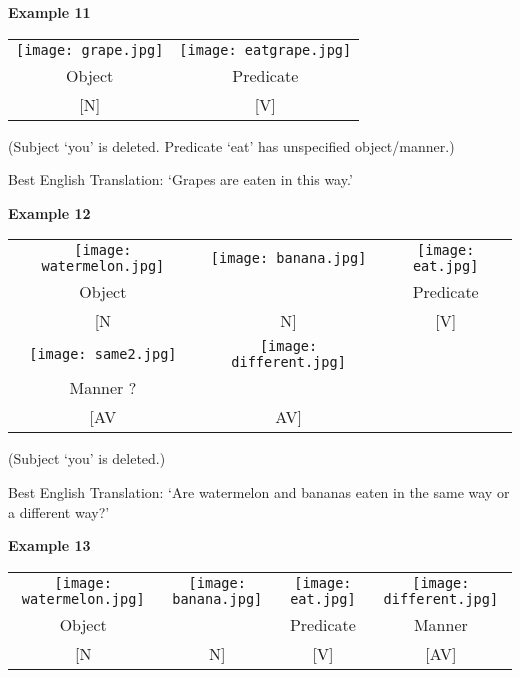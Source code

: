 \documentclass{tufte-book}
\begin{document}
\vspace{0.25cm}\noindent \textbf{Example 11}
\begin{table*}[h!]
\begin{tabular}{c | c }
\texttt{[image: grape.jpg]}&\texttt{[image: eatgrape.jpg]}\\
\footnotesize Object & \footnotesize Predicate \\
\footnotesize [N] & \footnotesize [V] \\
\end{tabular}
\end{table*}
\begin{fullwidth}
(Subject `you' is deleted. Predicate `eat' has unspecified object/manner.)

Best English Translation: `Grapes are eaten in this way.'
\end{fullwidth}
\newpage
\noindent \textbf{Example 12}
\begin{table*}[h!]
\begin{tabular}{c  c |c}
\texttt{[image: watermelon.jpg]}&\texttt{[image: banana.jpg]}&\texttt{[image: eat.jpg]}\\
\footnotesize Object & & \footnotesize Predicate  \\
\footnotesize [N & \footnotesize N] & \footnotesize [V]\\
\texttt{[image: same2.jpg]}&\texttt{[image: different.jpg]}&\\
\footnotesize Manner ? &  & \\
\footnotesize [AV & \footnotesize AV] & \\
\end{tabular}
\end{table*}
\begin{fullwidth}
(Subject `you' is deleted.)

Best English Translation: `Are watermelon and bananas eaten in the same way or a different way?'
\end{fullwidth}

\vspace{0.25cm}\noindent \textbf{Example 13}
\begin{table*}[h!]
\begin{tabular}{c c| c | c}
\texttt{[image: watermelon.jpg]}&\texttt{[image: banana.jpg]}&\texttt{[image: eat.jpg]}&\texttt{[image: different.jpg]}\\
\footnotesize Object & &  \footnotesize Predicate & \footnotesize Manner\\
\footnotesize [N & \footnotesize N] & \footnotesize [V]& \footnotesize [AV]\\
\end{tabular}
\end{table*}
\end{document}
